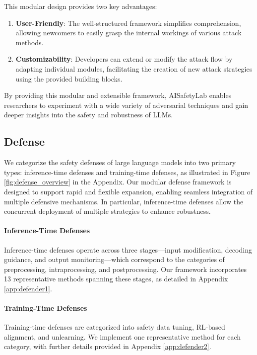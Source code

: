 This modular design provides two key advantages:
\begin{enumerate}
\item \textbf{User-Friendly}: The well-structured framework simplifies comprehension, allowing newcomers to easily grasp the internal workings of various attack methods.
\item \textbf{Customizability}: Developers can extend or modify the attack flow by adapting individual modules, facilitating the creation of new attack strategies using the provided building blocks.
\end{enumerate}

By providing this modular and extensible framework, AISafetyLab enables researchers to experiment with a wide variety of adversarial techniques and gain deeper insights into the safety and robustness of LLMs.


\subsection{Defense}
\label{appsec:overview_defense}

We categorize the safety defenses of large language models into two primary types: inference-time defenses and training-time defenses, as illustrated in Figure \ref{fig:defense_overview} in the Appendix. Our modular defense framework is designed to support rapid and flexible expansion, enabling seamless integration of multiple defensive mechanisms. In particular, inference-time defenses allow the concurrent deployment of multiple strategies to enhance robustness.

\paragraph{Inference-Time Defenses} Inference-time defenses operate across three stages—input modification, decoding guidance, and output monitoring—which correspond to the categories of preprocessing, intraprocessing, and postprocessing. Our framework incorporates 13 representative methods spanning these stages, as detailed in Appendix \ref{app:defender1}.

\paragraph{Training-Time Defenses} Training-time defenses are categorized into safety data tuning, RL-based alignment, and unlearning. We implement one representative method for each category, with further details provided in Appendix \ref{app:defender2}.


